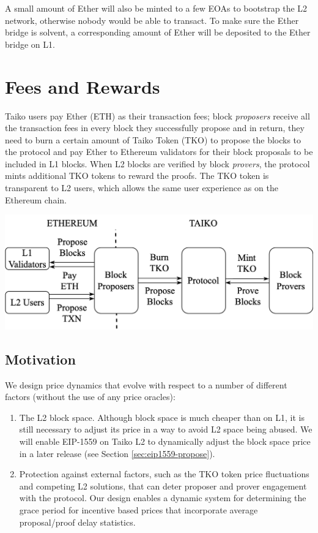 \documentclass[9pt,oneside]{amsart}
\newenvironment{Figure}
  {\par\medskip\noindent\minipage{\linewidth}}
  {\endminipage\par\medskip}
\begin{document}
\begin{multicols}{2}
A small amount of Ether will also be minted to a few EOAs to bootstrap the L2 network, otherwise nobody would be able to transact. To make sure the Ether bridge is solvent, a corresponding amount of Ether will be deposited to the Ether bridge on L1.

\section{Fees and Rewards}\label{sec:tokenomics}

Taiko users pay Ether (ETH) as their transaction fees; block \emph{proposers} receive all the transaction fees in every block they successfully propose and in return, they need to burn a certain amount of Taiko Token (TKO) to propose the blocks to the protocol and pay Ether to Ethereum validators for their block proposals to be included in L1 blocks. When L2 blocks are verified by block \emph{provers}, the protocol mints additional TKO tokens to reward the proofs. The TKO token is transparent to L2 users, which allows the same user experience as on the Ethereum chain.

\begin{Figure}
 \centering
 \includegraphics[width=\linewidth]{fig/taikoEcosystemFin2.png}
 \label{fig:taiExchange}
 
\end{Figure}


\subsection{Motivation}
We design price dynamics that evolve with respect to a number of different factors (without the use of any price oracles):
\begin{enumerate}
\item The L2 block space. Although block space is much cheaper than on L1, it is still necessary to adjust its price in a way to avoid L2 space being abused. We will enable EIP-1559 on Taiko L2 to dynamically adjust the block space price in a later release (see Section \ref{sec:eip1559-propose}).
\item Protection against external factors, such as the TKO token price fluctuations and competing L2 solutions, that can deter proposer and prover engagement with the protocol. Our design enables a dynamic system for determining the grace period for incentive based prices that incorporate average proposal/proof delay statistics. 


\end{enumerate}
\end{multicols}
\end{document}
